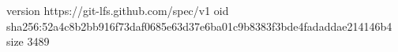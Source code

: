 version https://git-lfs.github.com/spec/v1
oid sha256:52a4c8b2bb916f73daf0685e63d37e6ba01c9b8383f3bde4fadaddae214146b4
size 3489
